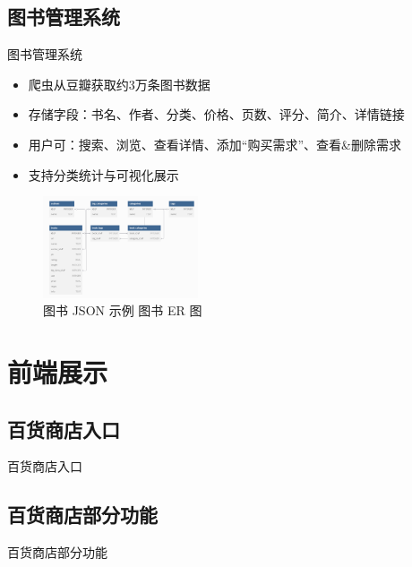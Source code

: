 \documentclass{ctexbeamer}
\begin{document}
\subsection{图书管理系统}
\begin{frame}{图书管理系统}
  \begin{itemize}
    \item 爬虫从豆瓣获取约3万条图书数据
    \item 存储字段：书名、作者、分类、价格、页数、评分、简介、详情链接
    \item 用户可：搜索、浏览、查看详情、添加“购买需求”、查看&删除需求
    \item 支持分类统计与可视化展示
  \end{itemize}
  \vspace{0.3cm}
  \begin{figure}
    \centering
    \includegraphics[height=3cm]{fig/bookER.png}
    \caption{图书 JSON 示例 \quad 图书 ER 图}
  \end{figure}
\end{frame}

\section{前端展示}

\subsection{百货商店入口}
\begin{frame}{百货商店入口}
\end{frame}

\subsection{百货商店部分功能}
\begin{frame}{百货商店部分功能}
\end{frame}
\end{document}
